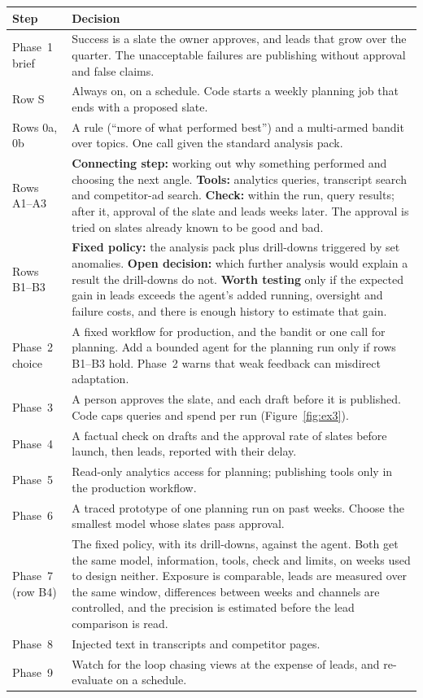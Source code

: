 \documentclass[10pt]{article}
\begin{document}
\begin{center}
\small
\begin{tabularx}{\linewidth}{@{}p{2.7cm} L@{}}
\toprule
Step & Decision \\
\midrule
Phase~1 brief & Success is a slate the owner approves, and leads that grow over the quarter. The unacceptable failures are publishing without approval and false claims. \\
Row S & Always on, on a schedule. Code starts a weekly planning job that ends with a proposed slate. \\
Rows 0a, 0b & A rule (``more of what performed best'') and a multi-armed bandit over topics. One call given the standard analysis pack. \\
Rows A1--A3 & \textbf{Connecting step:} working out why something performed and choosing the next angle. \textbf{Tools:} analytics queries, transcript search and competitor-ad search. \textbf{Check:} within the run, query results; after it, approval of the slate and leads weeks later. The approval is tried on slates already known to be good and bad. \\
Rows B1--B3 & \textbf{Fixed policy:} the analysis pack plus drill-downs triggered by set anomalies. \textbf{Open decision:} which further analysis would explain a result the drill-downs do not. \textbf{Worth testing} only if the expected gain in leads exceeds the agent's added running, oversight and failure costs, and there is enough history to estimate that gain. \\
Phase~2 choice & A fixed workflow for production, and the bandit or one call for planning. Add a bounded agent for the planning run only if rows B1--B3 hold. Phase~2 warns that weak feedback can misdirect adaptation. \\
Phase~3 & A person approves the slate, and each draft before it is published. Code caps queries and spend per run (Figure~\ref{fig:ex3}). \\
Phase~4 & A factual check on drafts and the approval rate of slates before launch, then leads, reported with their delay. \\
Phase~5 & Read-only analytics access for planning; publishing tools only in the production workflow. \\
Phase~6 & A traced prototype of one planning run on past weeks. Choose the smallest model whose slates pass approval. \\
Phase~7 (row B4) & The fixed policy, with its drill-downs, against the agent. Both get the same model, information, tools, check and limits, on weeks used to design neither. Exposure is comparable, leads are measured over the same window, differences between weeks and channels are controlled, and the precision is estimated before the lead comparison is read. \\
Phase~8 & Injected text in transcripts and competitor pages. \\
Phase~9 & Watch for the loop chasing views at the expense of leads, and re-evaluate on a schedule. \\
\bottomrule
\end{tabularx}
\end{center}
\end{document}
